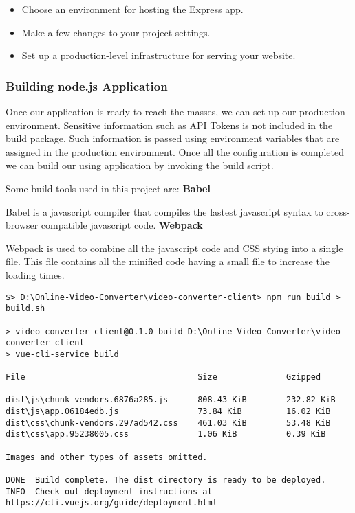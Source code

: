 			\begin{itemize}
			\item Choose an environment for hosting the Express app.
			\item Make a few changes to your project settings.
			\item Set up a production-level infrastructure for serving your website.
			\end{itemize}
			\subsubsection{Building node.js Application}
Once our application is ready to reach the masses, we can set up our production environment. Sensitive information such as API Tokens is not included in the build package. Such information is passed using environment variables that are assigned in the production environment. Once all the configuration is completed we can build our using application by invoking the build script. 

Some build tools used in this project are: 
\vs
\textbf{Babel}

Babel is a javascript compiler that compiles the lastest javascript syntax to cross-browser compatible javascript code.
\vs
\textbf{Webpack}

Webpack is used to combine all the javascript code and CSS stying into a single file. This file contains all the minified code having a small file to increase the loading times. 
\vs
\begin{verbatim}
$> D:\Online-Video-Converter\video-converter-client> npm run build > build.sh  

> video-converter-client@0.1.0 build D:\Online-Video-Converter\video-converter-client
> vue-cli-service build

File                                   Size              Gzipped

dist\js\chunk-vendors.6876a285.js      808.43 KiB        232.82 KiB
dist\js\app.06184edb.js                73.84 KiB         16.02 KiB
dist\css\chunk-vendors.297ad542.css    461.03 KiB        53.48 KiB
dist\css\app.95238005.css              1.06 KiB          0.39 KiB

Images and other types of assets omitted.

DONE  Build complete. The dist directory is ready to be deployed.
INFO  Check out deployment instructions at https://cli.vuejs.org/guide/deployment.html
\end{verbatim}

